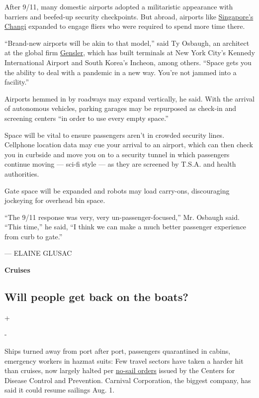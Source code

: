 After 9/11, many domestic airports adopted a militaristic appearance
with barriers and beefed-up security checkpoints. But abroad, airports
like
\href{https://www.nytimes.com/2019/12/02/travel/Singapore-Changi-Airport.html}{Singapore's
Changi} expanded to engage fliers who were required to spend more time
there.

``Brand-new airports will be akin to that model,'' said Ty Osbaugh, an
architect at the global firm \href{https://www.gensler.com/}{Gensler},
which has built terminals at New York City's Kennedy International
Airport and South Korea's Incheon, among others. ``Space gets you the
ability to deal with a pandemic in a new way. You're not jammed into a
facility.''

Airports hemmed in by roadways may expand vertically, he said. With the
arrival of autonomous vehicles, parking garages may be repurposed as
check-in and screening centers ``in order to use every empty space.''

Space will be vital to ensure passengers aren't in crowded security
lines. Cellphone location data may cue your arrival to an airport, which
can then check you in curbside and move you on to a security tunnel in
which passengers continue moving --- sci-fi style --- as they are
screened by T.S.A. and health authorities.

Gate space will be expanded and robots may load carry-ons, discouraging
jockeying for overhead bin space.

``The 9/11 response was very, very un-passenger-focused,'' Mr. Osbaugh
said. ``This time,'' he said, ``I think we can make a much better
passenger experience from curb to gate.''

--- ELAINE GLUSAC

\textbf{Cruises}

\hypertarget{will-people-get-back-on-the-boats}{%
\subsection{Will people get back on the
boats?}\label{will-people-get-back-on-the-boats}}

+

-

Ships turned away from port after port, passengers quarantined in
cabins, emergency workers in hazmat suits: Few travel sectors have taken
a harder hit than cruises, now largely halted per
\href{https://www.federalregister.gov/documents/2020/04/15/2020-07930/no-sail-order-and-suspension-of-further-embarkation-notice-of-modification-and-extension-and-other}{no-sail
orders} issued by the Centers for Disease Control and Prevention.
Carnival Corporation, the biggest company, has said it could resume
sailings Aug. 1.

